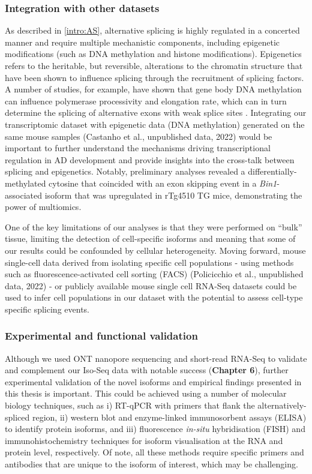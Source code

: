 \subsubsection{Integration with other datasets} 
\label{integration_methylation}
As described in \cref{intro:AS}, alternative splicing is highly regulated in a concerted manner and require multiple mechanistic components, including epigenetic modifications (such as DNA methylation and histone modifications). Epigenetics refers to the heritable, but reversible, alterations to the chromatin structure that have been shown to influence splicing through the recruitment of splicing factors\cite{Yang2014, Shukla2011, Zhang2020a, Shukla2011, Luco2011}. A number of studies, for example, have shown that gene body DNA methylation can influence polymerase processivity and elongation rate, which can in turn determine the splicing of alternative exons with weak splice sites \cite{Yang2014, Shukla2011}. Integrating our transcriptomic dataset with epigenetic data (DNA methylation) generated on the same mouse samples (Castanho et al., unpublished data, 2022) would be important to further understand the mechanisms driving transcriptional regulation in AD development and provide insights into the cross-talk between splicing and epigenetics. Notably, preliminary analyses revealed a differentially-methylated cytosine that coincided with an exon skipping event in a \textit{Bin1}-associated isoform that was upregulated in rTg4510 TG mice, demonstrating the power of multiomics.

One of the key limitations of our analyses is that they were performed on “bulk” tissue, limiting the detection of cell-specific isoforms and meaning that some of our results could be confounded by cellular heterogeneity. Moving forward, mouse single-cell data derived from isolating specific cell populations - using methods such as fluorescence-activated cell sorting (FACS) (Policicchio et al., unpublished data, 2022) - or publicly available mouse single cell RNA-Seq datasets could be used to infer cell populations in our dataset with the potential to assess cell-type specific splicing events.   

\subsubsection{Experimental and functional validation}
\label{ch7: validation}
Although we used ONT nanopore sequencing and short-read RNA-Seq to validate and complement our Iso-Seq data with notable success (\textbf{Chapter 6}), further experimental validation of the novel isoforms and empirical findings presented in this thesis is important. This could be achieved using a number of molecular biology techniques, such as i) RT-qPCR with primers that flank the alternatively-spliced region, ii) western blot and enzyme-linked immunosorbent assays (ELISA) to identify protein isoforms, and iii) fluorescence \textit{in-situ} hybridisation (FISH) and immunohistochemistry techniques for isoform visualisation at the RNA and protein level, respectively. Of note, all these methods require specific primers and antibodies that are unique to the isoform of interest, which may be challenging. 

